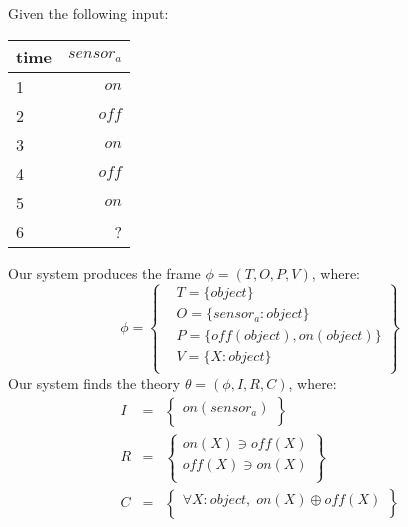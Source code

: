 
Given the following input:
\begin{table}[ht!]
\begin{center}
\begin{tabular}{|l|r|}
\hline
time & $\mathit{sensor}_a$\\
\hline
1 & $\mathit{on}$ \\
2 & $\mathit{off}$ \\
3 & $\mathit{on}$ \\
4 & $\mathit{off}$ \\
5 & $\mathit{on}$ \\
6 & ? \\
\hline
\end{tabular}
\end{center}
\end{table}

Our system produces the frame $\phi = (T, O, P, V)$, where:
\begin{equation*}
\phi = \left \{
\begin{aligned}
& T = \{ 
object
\}\\
& O = \{
\mathit{sensor}_a: object
\}\\
& P = \{
\mathit{off}(object),\mathit{on}(object)
\}\\
& V = \{
X: object
\}\\
\end{aligned}\right\}
\end{equation*}
Our system finds the theory $\theta = (\phi, I, R, C)$, where:
\begin{eqnarray*}
I & = & \left\{ \begin{array}{l}
\mathit{on}(\mathit{sensor}_a)\\
\end{array}\right\}\\
R & = &  \left\{ \begin{array}{l}
\mathit{on}(\mathit{X}) \ni \mathit{off}(\mathit{X})\\
\mathit{off}(\mathit{X}) \ni \mathit{on}(\mathit{X})\\
\end{array}\right\}\\
C & = & \left\{ \begin{array}{l}
\forall X : object,\;\mathit{on}(X) \oplus \mathit{off}(X)\\
\end{array}\right\}\\
\end{eqnarray*}

